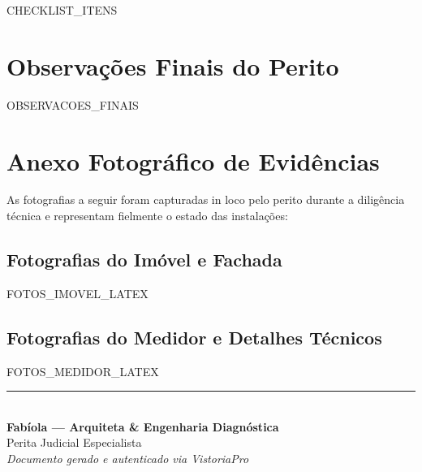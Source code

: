 \documentclass[11pt,a4paper]{article}
\begin{document}
\begin{itemize}
{{CHECKLIST_ITENS}}
\end{itemize}

\vspace{0.4cm}

\section{Observações Finais do Perito}

{{OBSERVACOES_FINAIS}}

\vspace{0.8cm}

\newpage
\section{Anexo Fotográfico de Evidências}
\label{sec:fotos}

As fotografias a seguir foram capturadas in loco pelo perito durante a diligência técnica e representam fielmente o estado das instalações:

\subsection{Fotografias do Imóvel e Fachada}
{{FOTOS_IMOVEL_LATEX}}

\vspace{0.6cm}

\subsection{Fotografias do Medidor e Detalhes Técnicos}
{{FOTOS_MEDIDOR_LATEX}}

\vspace{1.5cm}

\begin{center}
    \rule{8cm}{0.6pt}\\[4pt]
    \textbf{Fabíola — Arquiteta \& Engenharia Diagnóstica}\\[2pt]
    Perita Judicial Especialista\\
    \textit{Documento gerado e autenticado via VistoriaPro}
\end{center}
\end{document}
